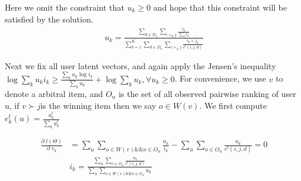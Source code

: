 \documentclass{article}
\begin{document}
Here we omit the constraint that $u_k \geq 0$ and hope that this constraint will be satisfied by the solution.
\begin{align}
u_k = \frac{\sum_{d\in D_u} \sum_{i \succ_d j} \frac{i_k}{\sum_k i_k} }{\sum_{k=1}^K \sum_{d\in D_u} \sum_{i \succ_d j}\frac{i_k+j_k}{c^t(i,j,d)}}
\end{align}


Next we fix all user latent vectors, and again apply the Jensen’s inequality $\log \sum_k u_k i_k \geq \frac{\sum_k u_k \log i_k}{\sum_k u_k}+ \log \sum_k u_k,\forall u_k \geq 0$.  For convenience, we use $v$  to denote a arbitral item, and $O_u$  is the set of all observed pairwise ranking of user u, if $ v \succ j $is the winning item then we say $o \in W(v)$.  We first compute $e_k^t(u) = \frac{u_k^t}{\sum_k u_k^t}$


\begin{align}
\frac{\partial \;l(\Theta) }{\partial \;v_k}
 &=\sum_{u} \sum_{o \in W(v) \&\& o \in O_u} \frac{u_k}{i_k} - \sum_{u} \sum_{o \in O_u} \frac{u_k}{c^t(i, j, d)} =0\\
 & i_k =\frac{\sum_{u} \sum_{o \in O_u} \frac{u_k}{c^t(i, j, d)}}{\sum_{u} \sum_{o \in W(v) \&\& o \in O_u} u_k}
\end{align}
\end{document}

